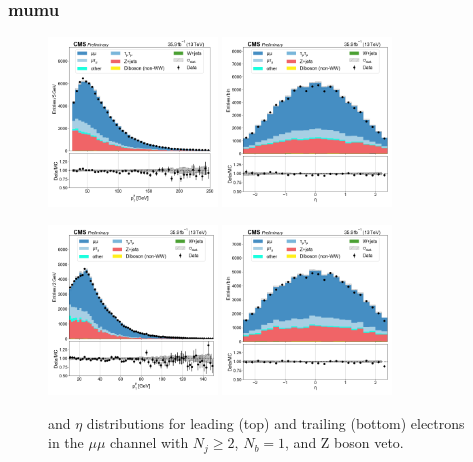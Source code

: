 \subsubsection{mumu}
\begin{figure}[htb!]
    \centering
    \includegraphics[width=0.4\textwidth]{chapters/Analysis/sectionPlots/figures/data_mc_overlays/mumu_2016_cat_gt2_eq1_b_signal_linear_lepton_lepton1_pt}
    \includegraphics[width=0.4\textwidth]{chapters/Analysis/sectionPlots/figures/data_mc_overlays/mumu_2016_cat_gt2_eq1_b_signal_linear_lepton_lepton1_eta}

    \includegraphics[width=0.4\textwidth]{chapters/Analysis/sectionPlots/figures/data_mc_overlays/mumu_2016_cat_gt2_eq1_b_signal_linear_lepton_lepton2_pt}
    \includegraphics[width=0.4\textwidth]{chapters/Analysis/sectionPlots/figures/data_mc_overlays/mumu_2016_cat_gt2_eq1_b_signal_linear_lepton_lepton2_eta}
    \caption{\pt and $\eta$ distributions for leading (top) and trailing
    (bottom) electrons in the $\mu\mu$ channel with $N_{j} \geq 2$, $N_{b}
    = 1$, and Z boson veto.}
    \label{fig:analysis:plots:mumu_1_kinematic}
\end{figure}

